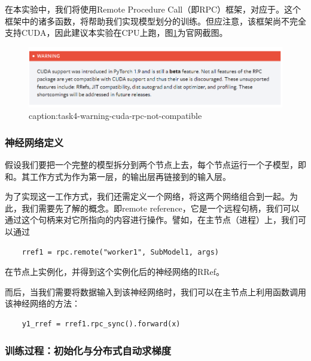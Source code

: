 在本实验中，我们将使用Remote Procedure Call（即RPC）框架，对应于。这个框架中的诸多函数，将帮助我们实现模型划分的训练。但应注意，该框架尚不完全支持CUDA，因此建议本实验在CPU上跑，图\ref{fig:task4-warning-cuda-rpc-not-compatible}为官网截图。
\begin{figure}[htbp]
	\centering
	\includegraphics[width=1\textwidth]{figures/task4-warning-cuda-rpc-not-compatible.png}
	\caption{caption:task4-warning-cuda-rpc-not-compatible}
	\label{fig:task4-warning-cuda-rpc-not-compatible}
\end{figure}

\subsubsection{神经网络定义}

假设我们要把一个完整的模型拆分到两个节点上去，每个节点运行一个子模型，即和。其工作方式为作为第一层，的输出层再链接到的输入层。

为了实现这一工作方式，我们还需定义一个网络，将这两个网络组合到一起。为此，我们需要先了解的概念。即remote reference，它是一个远程句柄，我们可以通过这个句柄来对它所指向的内容进行操作。譬如，在主节点（进程）上，我们可以通过
\begin{lstlisting}
    rref1 = rpc.remote("worker1", SubModel1, args)
\end{lstlisting}
在节点上实例化，并得到这个实例化后的神经网络的RRef。

而后，当我们需要将数据输入到该神经网络时，我们可以在主节点上利用函数调用该神经网络的方法：
\begin{lstlisting}
    y1_rref = rref1.rpc_sync().forward(x)
\end{lstlisting}

\subsubsection{训练过程：初始化与分布式自动求梯度}

